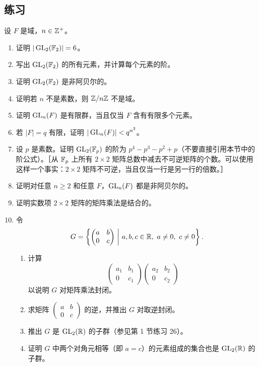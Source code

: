 \subsection*{练习}

设 $F$ 是域，$n\in\mathbb{Z}^+$。
\begin{enumerate}[label=\arabic*.]
  \item 证明 $|\operatorname{GL}_2(\mathbb{F}_2)|=6$。
  \item 写出 $\operatorname{GL}_2(\mathbb{F}_2)$ 的所有元素，并计算每个元素的阶。
  \item 证明 $\operatorname{GL}_2(\mathbb{F}_2)$ 是非阿贝尔的。
  \item 证明若 $n$ 不是素数，则 $\mathbb{Z}/n\mathbb{Z}$ 不是域。
  \item 证明 $\operatorname{GL}_n(F)$ 是有限群，当且仅当 $F$ 含有有限多个元素。
  \item 若 $|F|=q$ 有限，证明 $|\operatorname{GL}_n(F)|<q^{n^2}$。
  \item 设 $p$ 是素数。证明 $\operatorname{GL}_2(\mathbb{F}_p)$ 的阶为 $p^4-p^3-p^2+p$（不要直接引用本节中的阶公式）。［从 $\mathbb{F}_p$ 上所有 $2\times2$ 矩阵总数中减去不可逆矩阵的个数。可以使用这样一个事实：$2\times2$ 矩阵不可逆，当且仅当一行是另一行的倍数。］
  \item 证明对任意 $n\geq2$ 和任意 $F$，$\operatorname{GL}_n(F)$ 都是非阿贝尔的。
  \item 证明实数项 $2\times2$ 矩阵的矩阵乘法是结合的。
  \item 令
  \[
    G=\left\{\begin{pmatrix}a&b\\0&c\end{pmatrix}\ \middle|\ a,b,c\in\RR,\ a\neq0,\ c\neq0\right\}.
  \]
  \begin{enumerate}[label=(\alph*)]
    \item 计算
    \[
      \begin{pmatrix}a_1&b_1\\0&c_1\end{pmatrix}
      \begin{pmatrix}a_2&b_2\\0&c_2\end{pmatrix}
    \]
    以说明 $G$ 对矩阵乘法封闭。
    \item 求矩阵 $\begin{pmatrix}a&b\\0&c\end{pmatrix}$ 的逆，并推出 $G$ 对取逆封闭。
    \item 推出 $G$ 是 $\operatorname{GL}_2(\mathbb{R})$ 的子群（参见第 1 节练习 26）。
    \item 证明 $G$ 中两个对角元相等（即 $a=c$）的元素组成的集合也是 $\operatorname{GL}_2(\mathbb{R})$ 的子群。
  \end{enumerate}
\end{enumerate}

